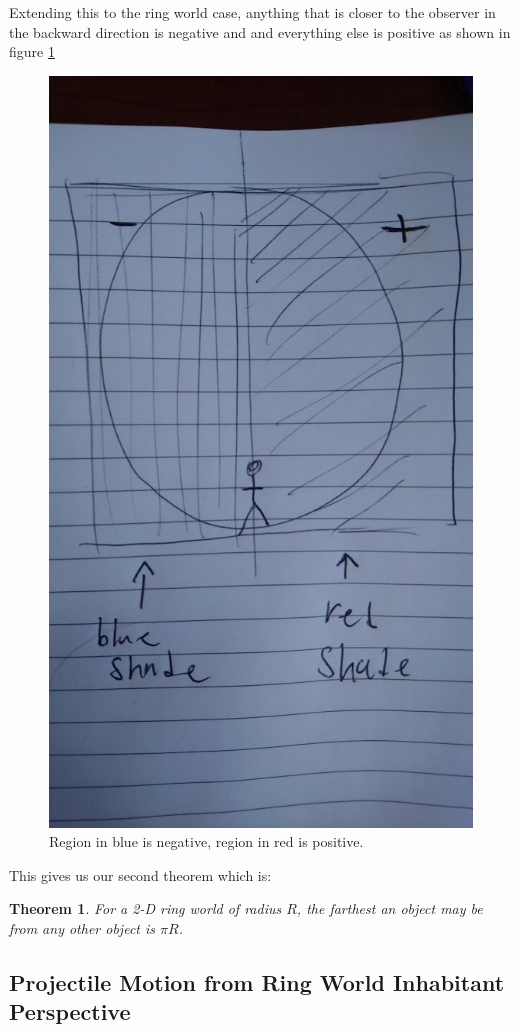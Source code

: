 \documentclass{amsart}
\newtheorem{theorem}{Theorem}[section]
\theoremstyle{definition}
\begin{document}
Extending this to the ring world case, anything that is closer to the observer in the backward direction is negative and and everything 
else is positive as shown in figure \ref{fig:neg_positive_horizontal}




\begin{figure}
	\centering
	\includegraphics[width=0.7\linewidth]{figures/define_neg_pos_rough.JPG}
	\caption{Region in blue is negative, region in red is positive.}
	\label{fig:neg_positive_horizontal}
\end{figure}

This gives us our second theorem which is: 
\begin{theorem}
  For a 2-D ring world of radius $R$, the farthest an object may be from any other object is $\pi R$.
\end{theorem}

\subsection{Projectile Motion from Ring World Inhabitant Perspective}
\end{document}

